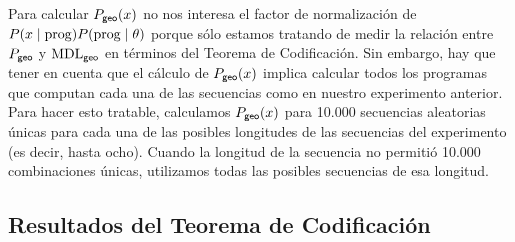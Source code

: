 
Para calcular $P_{{\sf geo}}(x)$ no nos interesa el factor de normalización de $P(x \mid {\rm prog}) P({\rm prog} \mid \theta)$ porque sólo estamos tratando de medir la relación entre $P_{{\sf geo}}$ y ${\rm MDL}_{{\sf geo}}$ en términos del Teorema de Codificación. Sin embargo, hay que tener en cuenta que el cálculo de $P_{{\sf geo}}(x)$ implica calcular todos los programas que computan cada una de las secuencias como en nuestro experimento anterior. Para hacer esto tratable, calculamos $P_{{\sf geo}}(x)$ para 10.000 secuencias aleatorias únicas para cada una de las posibles longitudes de las secuencias del experimento (es decir, hasta ocho). Cuando la longitud de la secuencia no permitió 10.000 combinaciones únicas, utilizamos todas las posibles secuencias de esa longitud.

\subsection{Resultados del Teorema de Codificación}


